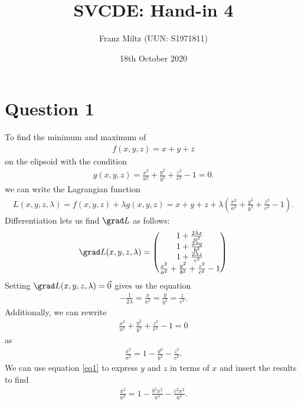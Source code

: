 \documentclass{article}
\begin{document}
\title{SVCDE: Hand-in 4}
\author{Franz Miltz (UUN: S1971811)}
\date{18th October 2020}
\maketitle


\section*{Question 1}


To find the minimum and maximum of
\begin{align*}
	f(x,y,z)=x + y + z
\end{align*}
on the elipsoid with the condition
\begin{align*}
	g(x,y,z)=\frac{x^2}{a^2} + \frac{y^2}{b^2} + \frac{z^2}{c^2}-1=0.
\end{align*}
we can write the Lagrangian function
\begin{align*}
	L(x,y,z,\lambda) = f(x,y,z)+\lambda g(x,y,z) =  x + y + z + \lambda\left(\frac{x^2}{a^2}+\frac{y^2}{b^2}+\frac{z^2}{c^2}-1\right).
\end{align*}
Differentiation lets us find $\grad L$ as follows:
\begin{align*}
	\grad L(x,y,z,\lambda)=\begin{pmatrix}
		                       1+\frac{2\lambda x}{a^2} \\
		                       1+\frac{2\lambda y}{b^2} \\
		                       1+\frac{2\lambda z}{c^2} \\
		                       \frac{x^2}{a^2}+\frac{y^2}{b^2}+\frac{z^2}{c^2}-1
	                       \end{pmatrix}
\end{align*}
Setting $\grad L(x,y,z,\lambda)=\vec 0$ gives us the equation
\begin{align}
	\label{eq1}
	-\frac{1}{2\lambda} = \frac{x}{a^2} = \frac{y}{b^2} = \frac{z}{c^2}.
\end{align}
Additionally, we can rewrite
\begin{align*}
	\frac{x^2}{a^2}+\frac{y^2}{b^2}+\frac{z^2}{c^2}-1=0
\end{align*}
as
\begin{align*}
	\frac{x^2}{a^2}=1-\frac{y^2}{b^2}-\frac{z^2}{c^2}.
\end{align*}
We can use equation \ref{eq1} to express $y$ and $z$ in terms of $x$ and
insert the results to find
\begin{align*}
	\frac{x^2}{a^2}=1-\frac{b^2x^2}{a^4}-\frac{c^2x^2}{a^4}.
\end{align*}
\end{document}
